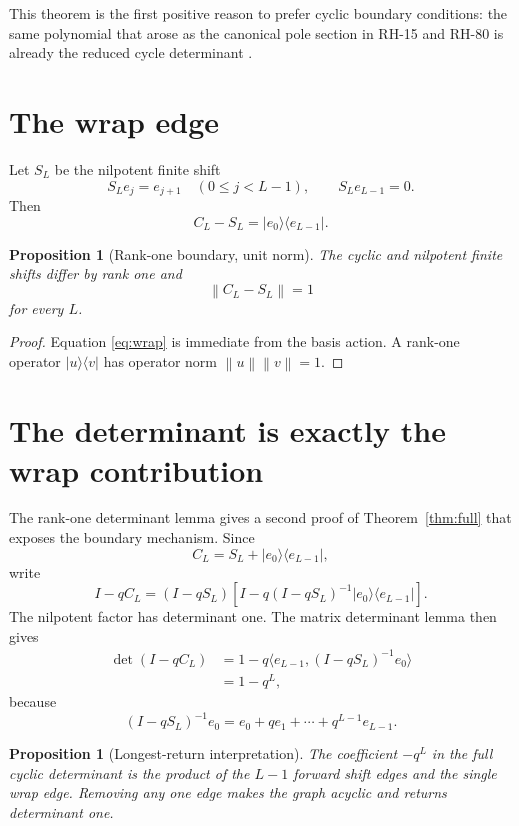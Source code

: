 \documentclass[12pt]{article}
\newtheorem{proposition}[theorem]{Proposition}
\theoremstyle{remark}
\newcommand{\norm}[1]{\left\lVert#1\right\rVert}
\begin{document}
This theorem is the first positive reason to prefer cyclic boundary
conditions: the same polynomial that arose as the canonical pole section in
RH-15 and RH-80 is already the reduced cycle determinant
\citep{WangRH15,WangRH80}.

\section{The wrap edge}

Let $S_L$ be the nilpotent finite shift
\[
 S_Le_j=e_{j+1}\quad(0\le j<L-1),
 \qquad S_Le_{L-1}=0.
\]
Then
\begin{equation}\label{eq:wrap}
 C_L-S_L=|e_0\rangle\langle e_{L-1}|.
\end{equation}

\begin{proposition}[Rank-one boundary, unit norm]\label{prop:wrap}
The cyclic and nilpotent finite shifts differ by rank one and
\begin{equation}\label{eq:norm-wall}
 \norm{C_L-S_L}=1
\end{equation}
for every $L$.
\end{proposition}

\begin{proof}
Equation \eqref{eq:wrap} is immediate from the basis action.  A rank-one
operator $|u\rangle\langle v|$ has operator norm $\norm u\norm v=1$.
\end{proof}

\section{The determinant is exactly the wrap contribution}

The rank-one determinant lemma gives a second proof of
Theorem~\ref{thm:full} that exposes the boundary mechanism.  Since
\[
 C_L=S_L+|e_0\rangle\langle e_{L-1}|,
\]
write
\[
 I-qC_L=(I-qS_L)
 \left[I-q(I-qS_L)^{-1}|e_0\rangle\langle e_{L-1}|\right].
\]
The nilpotent factor has determinant one.  The matrix determinant lemma then
gives
\begin{align}
 \det(I-qC_L)
 &=1-q\langle e_{L-1},(I-qS_L)^{-1}e_0\rangle
 \label{eq:det-lemma}\\
 &=1-q^L,
\end{align}
because
\[
 (I-qS_L)^{-1}e_0=e_0+qe_1+\cdots+q^{L-1}e_{L-1}.
\]

\begin{proposition}[Longest-return interpretation]\label{prop:return}
The coefficient $-q^L$ in the full cyclic determinant is the product of the
$L-1$ forward shift edges and the single wrap edge.  Removing any one edge
makes the graph acyclic and returns determinant one.
\end{proposition}
\end{document}
